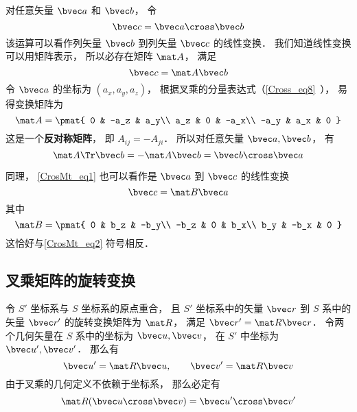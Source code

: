 
对任意矢量 $\bvec a$ 和 $\bvec b$， 令
\begin{equation}\label{CrosMt_eq1}
\bvec c = \bvec a \cross \bvec b
\end{equation}
该运算可以看作列矢量 $\bvec b$ 到列矢量 $\bvec c$ 的线性变换． 我们知道线性变换可以用矩阵表示， 所以必存在矩阵 $\mat A$， 满足
\begin{equation}\label{CrosMt_eq3}
\bvec c = \mat A \bvec b
\end{equation}
令 $\bvec a$ 的坐标为 $(a_x, a_y, a_z)$， 根据叉乘的分量表达式（\autoref{Cross_eq8}~）， 易得变换矩阵为
\begin{equation}\label{CrosMt_eq2}
\mat A = \pmat{
0 & -a_z & a_y\\
a_z & 0 & -a_x\\
-a_y & a_x & 0
}
\end{equation}
这是一个\textbf{反对称矩阵}， 即 $A_{ij} = -A_{ji}$． 所以对任意矢量 $\bvec a, \bvec b$， 有
\begin{equation}
\mat A\Tr\bvec b = -\mat A \bvec b = \bvec b\cross\bvec a
\end{equation}

同理， \autoref{CrosMt_eq1} 也可以看作是 $\bvec a$ 到 $\bvec c$ 的线性变换
\begin{equation}
\bvec c = \mat B \bvec a
\end{equation}
其中
\begin{equation}
\mat B = \pmat{
0 & b_z & -b_y\\
-b_z & 0 & b_x\\
b_y & -b_x & 0
}
\end{equation}
这恰好与\autoref{CrosMt_eq2} 符号相反．

\subsection{叉乘矩阵的旋转变换}\label{CrosMt_sub1}
令 $S'$ 坐标系与 $S$ 坐标系的原点重合， 且 $S'$ 坐标系中的矢量 $\bvec r$ 到 $S$ 系中的矢量 $\bvec r'$ 的旋转变换矩阵为 $\mat R$， 满足 $\bvec r' = \mat R\bvec r$． 令两个几何矢量在 $S$ 系中的坐标为 $\bvec u, \bvec v$， 在 $S'$ 中坐标为 $\bvec u', \bvec v'$． 那么有
\begin{equation}
\bvec u' = \mat R\bvec u, \qquad
\bvec v' = \mat R\bvec v
\end{equation}
由于叉乘的几何定义不依赖于坐标系， 那么必定有
\begin{equation}
\mat R(\bvec u\cross \bvec v) = \bvec u'\cross \bvec v'
\end{equation}

